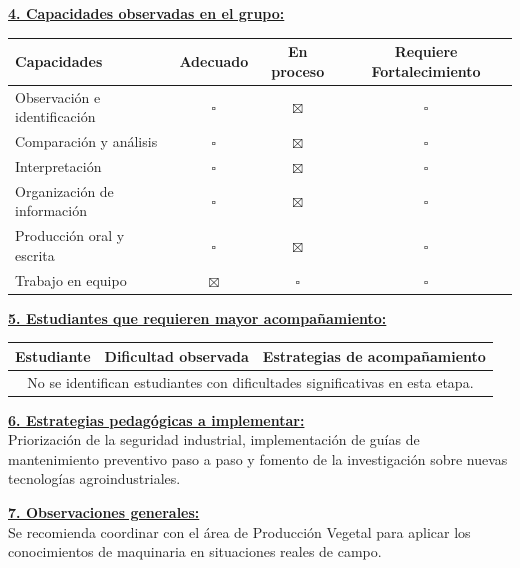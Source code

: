 \documentclass[a4paper]{article}
\begin{document}
\vspace{0.5cm}
\noindent\textbf{\underline{4. Capacidades observadas en el grupo:}}\\
\begin{center}
\begin{tabular}{|l|c|c|c|}
\hline
\rowcolor{gray!20}\fontsize{8pt}{10pt}\selectfont Capacidades & Adecuado & En proceso & Requiere Fortalecimiento \\ \hline
\fontsize{8pt}{10pt}\selectfont Observación e identificación & $\square$ & $\boxtimes$ & $\square$ \\ \hline
\fontsize{8pt}{10pt}\selectfont Comparación y análisis & $\square$ & $\boxtimes$ & $\square$ \\ \hline
\fontsize{8pt}{10pt}\selectfont Interpretación & $\square$ & $\boxtimes$ & $\square$ \\ \hline
\fontsize{8pt}{10pt}\selectfont Organización de información & $\square$ & $\boxtimes$ & $\square$ \\ \hline
\fontsize{8pt}{10pt}\selectfont Producción oral y escrita & $\square$ & $\boxtimes$ & $\square$ \\ \hline
\fontsize{8pt}{10pt}\selectfont Trabajo en equipo & $\boxtimes$ & $\square$ & $\square$ \\ \hline
\end{tabular}
\end{center}

\vspace{0.5cm}
\noindent\textbf{\underline{5. Estudiantes que requieren mayor acompañamiento:}}\\
\begin{center}
\begin{tabular}{|l|l|l|}
\hline
\rowcolor{gray!20} Estudiante & Dificultad observada & Estrategias de acompañamiento \\ \hline
\multicolumn{3}{|c|}{No se identifican estudiantes con dificultades significativas en esta etapa.} \\ \hline
\end{tabular}
\end{center}

\vspace{0.5cm}
\noindent\textbf{\underline{6. Estrategias pedagógicas a implementar:}}\\
\fontsize{11pt}{13pt}\selectfont Priorización de la seguridad industrial, implementación de guías de mantenimiento preventivo paso a paso y fomento de la investigación sobre nuevas tecnologías agroindustriales.

\vspace{0.5cm}
\noindent\textbf{\underline{7. Observaciones generales:}}\\
\fontsize{11pt}{13pt}\selectfont Se recomienda coordinar con el área de Producción Vegetal para aplicar los conocimientos de maquinaria en situaciones reales de campo.
\end{document}
